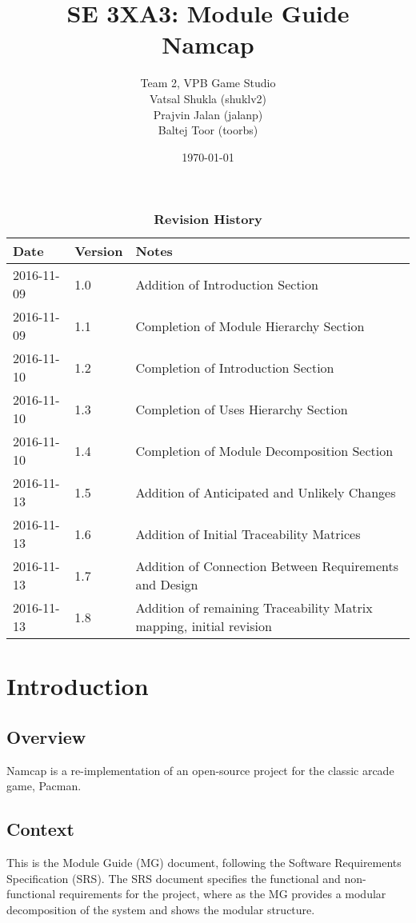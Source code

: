 \documentclass[12pt, titlepage]{article}
\title{SE 3XA3: Module Guide\\Namcap}
\author{Team 2, VPB Game Studio
		\\ Vatsal Shukla (shuklv2)
		\\ Prajvin Jalan (jalanp)
		\\ Baltej Toor (toorbs)
}
\date{\today}
\begin{document}
\maketitle

\tableofcontents
\listoftables
\listoffigures

\begin{table}[h]
\caption{\bf Revision History}
\begin{tabularx}{\textwidth}{p{3cm}p{2cm}X}
\toprule {\bf Date} & {\bf Version} & {\bf Notes}\\
\midrule
2016-11-09 & 1.0 & Addition of Introduction Section\\
2016-11-09 & 1.1 & Completion of Module Hierarchy Section\\
2016-11-10 & 1.2 & Completion of Introduction Section\\
2016-11-10 & 1.3 & Completion of Uses Hierarchy Section\\
2016-11-10 & 1.4 & Completion of Module Decomposition Section\\
2016-11-13 & 1.5 & Addition of Anticipated and Unlikely Changes\\
2016-11-13 & 1.6 & Addition of Initial Traceability Matrices\\
2016-11-13 & 1.7 & Addition of Connection Between Requirements and Design\\
2016-11-13 & 1.8 & Addition of remaining Traceability Matrix mapping, initial revision\\
\bottomrule
\end{tabularx}
\end{table}

\newpage


\section{Introduction}

\subsection{Overview}
Namcap is a re-implementation of an open-source project for the classic arcade game, Pacman.

\subsection{Context}
This is the Module Guide (MG) document, following the Software Requirements Specification (SRS). The SRS document specifies the functional and non-functional requirements for the project, where as the MG provides a modular decomposition of the system and shows the modular structure.
\end{document}
